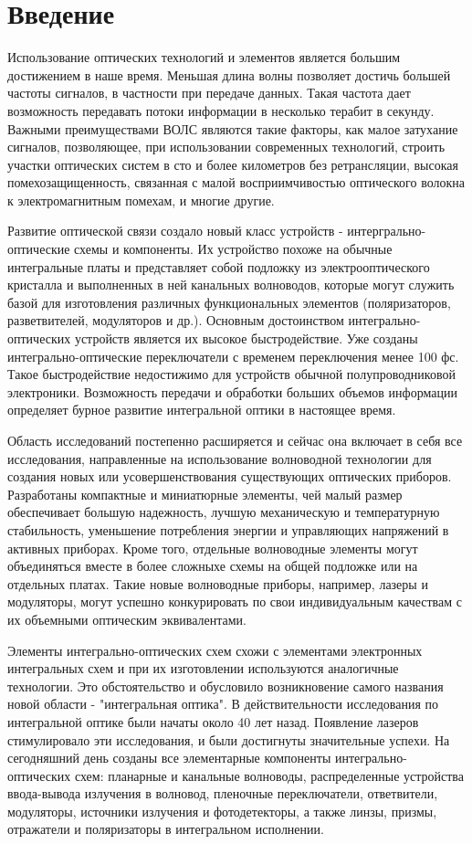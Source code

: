 \chapter*{Введение}
Использование оптических технологий и элементов является большим достижением в наше время. Меньшая длина волны позволяет достичь большей частоты сигналов, в частности при передаче данных. Такая частота дает возможность передавать потоки информации в несколько терабит в секунду. Важными преимуществами ВОЛС являются такие факторы, как малое затухание сигналов, позволяющее, при использовании современных технологий, строить участки оптических систем в сто и более километров без ретрансляции, высокая помехозащищенность, связанная с малой восприимчивостью оптического волокна к электромагнитным помехам, и многие другие.

Развитие оптической связи создало новый класс устройств - интергрально-оптические схемы и компоненты. Их устройство похоже на обычные интегральные платы и представляет собой подложку из электрооптического кристалла и выполненных в ней канальных волноводов, которые могут служить базой для изготовления различных функциональных элементов  (поляризаторов, разветвителей, модуляторов и др.). Основным достоинством интегрально-оптических устройств является их высокое быстродействие. Уже созданы интегрально-оптические  переключатели с временем переключения менее 100 фс. Такое быстродействие недостижимо для устройств обычной полупроводниковой электроники. Возможность передачи и обработки больших объемов информации определяет бурное развитие интегральной оптики в настоящее время.

Область исследований постепенно расширяется и сейчас она включает в себя все исследования, направленные на использование волноводной технологии для создания новых или усовершенствования существующих оптических приборов. Разработаны компактные и миниатюрные элементы, чей малый размер обеспечивает большую надежность, лучшую механическую и температурную стабильность, уменьшение потребления энергии и управляющих напряжений в активных приборах. Кроме того, отдельные волноводные элементы могут объединяться вместе в более сложныхе схемы на общей подложке или на отдельных платах. Такие новые волноводные приборы, например, лазеры и модуляторы, могут успешно конкурировать по свои индивидуальным качествам с их объемными оптическим эквивалентами.

Элементы интегрально-оптических схем схожи с элементами электронных интегральных схем и при их изготовлении используются аналогичные тех\-нологии. Это обстоятельство и обусловило возникновение самого названия новой области - "интегральная оптика". В действительности исследования по интегральной оптике были начаты около 40 лет назад. Появление лазеров стимулировало эти исследования, и были достигнуты значительные успехи. На сегодняшний день созданы все элементарные компоненты интегрально-оптических схем: планарные и канальные волноводы, распределенные устройства ввода-вывода излучения в волновод, пленочные переключатели, ответвители, модуляторы, источники излучения и фотодетекторы, а также линзы, призмы, отражатели и поляризаторы в интегральном исполнении.

